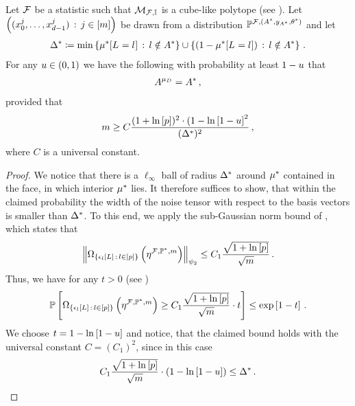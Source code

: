 \begin{theorem}
    Let $\mathcal{F}$ be a statistic such that $\mathcal{M}_{\mathcal{F},\mathbb{I}}$ is a cube-like polytope (see ).
    Let $\left(({x_{0}^{j},\ldots,x_{d-1}^{j}})\,:\,j\in[m]\right)$ be drawn from a distribution $\mathbb{P}^{\mathcal{F},(A^*,y_{A^*},\theta^*)}$ and let
    \begin{align*}
        \Delta^* \coloneqq \min
        \left\{\mu^*[L_{}=l_{}] \,:\, l\notin A^* \right\} \cup   \left\{(1-\mu^*[L_{}=l_{}]) \,:\, l\notin A^* \right\} \, .
    \end{align*}
    For any $u\in(0,1)$ we have the following with probability at least $1-u$ that
    \begin{align*}
        A^{\mu_{D}} = A^* \, ,
    \end{align*}
    provided that
    \begin{align*}
        m \geq C \frac{(1+\ln \left[ p \right])^2 \cdot (1-\ln \left[ 1-u \right]^2}{(\Delta^*)^2} \, ,
    \end{align*}
    where $C$ is a universal constant.
\end{theorem}
\begin{proof}
    We notice that there is a $\ell_\infty$ ball of radius $\Delta^*$ around $\mu^*$ contained in the face, in which interior $\mu^*$ lies.
    It therefore suffices to show, that within the claimed probability the width of the noise tensor with respect to the basis vectors is smaller than $\Delta^*$.
    To this end, we apply the sub-Gaussian norm bound of , which states that
    \begin{align*}
        \left\|\Omega_{\{\epsilon_{l}\left[L\right] \,:\, l\in[p] \}}\left(\eta^{\mathcal{F},\mathbb{P}^*,m}\right)\right\|_{\psi_2} \leq C_1 \frac{\sqrt{1+\ln \left[ p \right]}}{\sqrt{m}} \, .
    \end{align*}
    Thus, we have for any $t>0$ (see )
    \begin{align*}
        \mathbb{P}\left[\Omega_{\{\epsilon_{l}\left[L\right] \,:\, l\in[p] \}}\left(\eta^{\mathcal{F},\mathbb{P}^*,m}\right) \geq C_1 \frac{\sqrt{1+\ln \left[ p \right]}}{\sqrt{m}} \cdot t\right] \leq \mathrm{exp}\left[1-t\right] \, .
    \end{align*}
    We choose $t=1-\ln \left[ 1-u \right]$ and notice, that the claimed bound holds with the universal constant $C=(C_1)^2$, since in this case
    \begin{align*}
        C_1 \frac{\sqrt{1+\ln \left[ p \right]}}{\sqrt{m}} \cdot (1-\ln \left[ 1-u \right]) \leq \Delta^* \, .
    \end{align*}
\end{proof}

